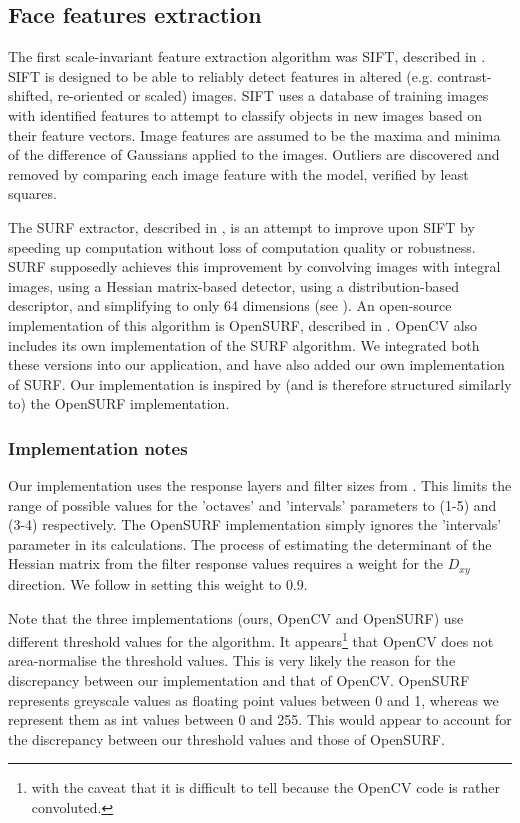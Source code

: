 
\subsection{Face features extraction}
\label{sec:features}

The first scale-invariant feature extraction algorithm was SIFT, described in \cite{SIFT}. SIFT is designed to be able to reliably detect features in altered (e.g. contrast-shifted, re-oriented or scaled) images. SIFT uses a database of training images with identified features to attempt to classify objects in new images based on their feature vectors. Image features are assumed to be the maxima and minima of the difference of Gaussians applied to the images. Outliers are discovered and removed by comparing each image feature with the model, verified by least squares.

The SURF extractor, described in \cite{SURF}, is an attempt to improve upon SIFT by speeding up computation without loss of computation quality or robustness. SURF supposedly achieves this improvement by convolving images with integral images, using a Hessian matrix-based detector, using a distribution-based descriptor, and simplifying to only 64 dimensions (see \cite{SURF}). An open-source implementation of this algorithm is OpenSURF, described in \cite{OpenSURF}. OpenCV also includes its own implementation of the SURF algorithm. We integrated both these versions into our application, and have also added our own implementation of SURF. Our implementation is inspired by (and is therefore structured similarly to) the OpenSURF implementation.

\subsubsection{Implementation notes}
Our implementation uses the response layers and filter sizes from \cite{SURF}. This limits the range of possible values for the 'octaves' and 'intervals' parameters to (1-5) and (3-4) respectively. The OpenSURF implementation simply ignores the 'intervals' parameter in its calculations. The process of estimating the determinant of the Hessian matrix from the filter response values requires a weight for the $D_{xy}$ direction. We follow \cite{SURF} in setting this weight to $0.9$.

Note that the three implementations (ours, OpenCV and OpenSURF) use different threshold values for the algorithm. It appears\footnote{with the caveat that it is difficult to tell because the OpenCV code is rather convoluted.} that OpenCV does not area-normalise the threshold values. This is very likely the reason for the discrepancy between our implementation and that of OpenCV. OpenSURF represents greyscale values as floating point values between 0 and 1, whereas we represent them as int values between 0 and 255. This would appear to account for the discrepancy between our threshold values and those of OpenSURF.

